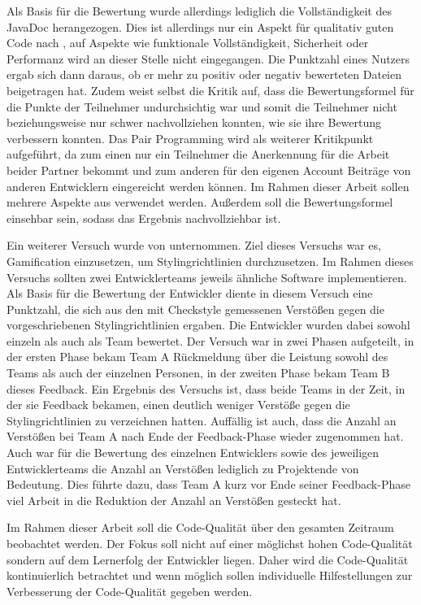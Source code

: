 \documentclass[
	oneside,  %
	ngerman, 
	final, 
	11pt, 
	a4paper, 
	1.1headlines, 
	headinclude=false, 
	footinclude=false, 
	mpinclude=false, 
	pagesize, 
	onecolumn, 
	titlepage, 
	parskip=half, 
	headsepline, 
	chapterprefix=false, 
	version=first, 
	listof=totoc, 
	bibliography=totoc, 
	toc=graduated, 
	fleqn
]{scrbook}
\begin{document}
Als Basis für die Bewertung wurde allerdings lediglich die Vollständigkeit des JavaDoc herangezogen.
Dies ist allerdings nur ein Aspekt für qualitativ guten Code nach \cite{ISO-25010}, auf Aspekte wie funktionale Vollständigkeit, Sicherheit oder Performanz wird an dieser Stelle nicht eingegangen.
Die Punktzahl eines Nutzers ergab sich dann daraus, ob er mehr zu positiv oder negativ bewerteten Dateien beigetragen hat.
Zudem weist \cite{Prause2012} selbst die Kritik auf, dass die Bewertungsformel für die Punkte der Teilnehmer undurchsichtig war und somit die Teilnehmer nicht beziehungsweise nur schwer nachvollziehen konnten, wie sie ihre Bewertung verbessern konnten.
Das Pair Programming wird als weiterer Kritikpunkt aufgeführt, da zum einen nur ein Teilnehmer die Anerkennung für die Arbeit beider Partner bekommt und zum anderen für den eigenen Account Beiträge von anderen Entwicklern eingereicht werden können.
Im Rahmen dieser Arbeit sollen mehrere Aspekte aus \cite{ISO-25010} verwendet werden. Außerdem soll die Bewertungsformel einsehbar sein, sodass das Ergebnis nachvollziehbar ist. 

Ein weiterer Versuch wurde von \cite{PJ2015} unternommen.
Ziel dieses Versuchs war es, Gamification einzusetzen, um Stylingrichtlinien durchzusetzen.
Im Rahmen dieses Versuchs sollten zwei Entwicklerteams jeweils ähnliche Software implementieren. 
Als Basis für die Bewertung der Entwickler diente in diesem Versuch eine Punktzahl, die sich aus den mit Checkstyle gemessenen Verstößen gegen die vorgeschriebenen Stylingrichtlinien ergaben.
Die Entwickler wurden dabei sowohl einzeln als auch als Team bewertet.
Der Versuch war in zwei Phasen aufgeteilt, in der ersten Phase bekam Team A Rückmeldung über die Leistung sowohl des Teams als auch der einzelnen Personen, in der zweiten Phase bekam Team B dieses Feedback.
Ein Ergebnis des Versuchs ist, dass beide Teams in der Zeit, in der sie Feedback bekamen, einen deutlich weniger Verstöße gegen die Stylingrichtlinien zu verzeichnen hatten.
Auffällig ist auch, dass die Anzahl an Verstößen bei Team A nach Ende der Feedback-Phase wieder zugenommen hat.
Auch war für die Bewertung des einzelnen Entwicklers sowie des jeweiligen Entwicklerteams die Anzahl an Verstößen lediglich zu Projektende von Bedeutung.
Dies führte dazu, dass Team A kurz vor Ende seiner Feedback-Phase viel Arbeit in die Reduktion der Anzahl an Verstößen gesteckt hat.

Im Rahmen dieser Arbeit soll die Code-Qualität über den gesamten Zeitraum beobachtet werden.
Der Fokus soll nicht auf einer möglichst hohen Code-Qualität sondern auf dem Lernerfolg der Entwickler liegen.
Daher wird die Code-Qualität kontinuierlich betrachtet und wenn möglich sollen individuelle Hilfestellungen zur Verbesserung der Code-Qualität gegeben werden.
\end{document}
